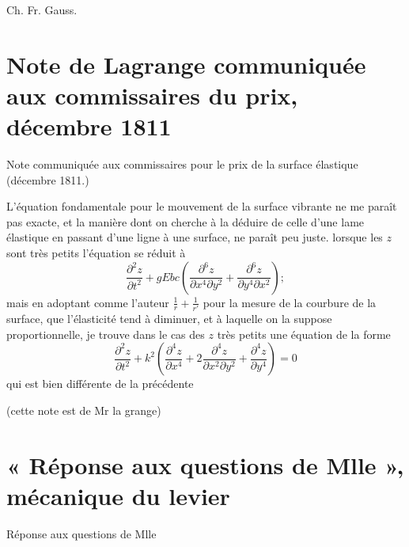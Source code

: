 \documentclass[11pt,a4paper]{article}
\begin{document}
Ch. Fr. Gauss.

\section{Note de Lagrange communiquée aux commissaires du prix, décembre 1811}

Note communiquée aux commissaires pour le prix de la surface élastique
(décembre 1811.)

L'équation fondamentale pour le mouvement de la surface vibrante ne me paraît
pas exacte, et la manière dont on cherche à la déduire de celle d'une lame
élastique en passant d'une ligne à une surface, ne paraît peu juste. lorsque
les $z$ sont très petits l'équation se réduit à
\[
\frac{\partial^2 z}{\partial t^2}
+ gEbc\left(\frac{\partial^6 z}{\partial x^4 \partial y^2}
+ \frac{\partial^6 z}{\partial y^4 \partial x^2}\right) ;
\]
mais en adoptant comme l'auteur $\frac{1}{r} + \frac{1}{r'}$ pour la mesure
de la courbure de la surface, que l'élasticité tend à diminuer, et à laquelle
on la suppose proportionnelle, je trouve dans le cas des $z$ très petits une
équation de la forme
\[
\frac{\partial^2 z}{\partial t^2}
+ k^2\left(\frac{\partial^4 z}{\partial x^4}
+ 2\frac{\partial^4 z}{\partial x^2 \partial y^2}
+ \frac{\partial^4 z}{\partial y^4}\right) = 0
\]
qui est bien différente de la précédente

(cette note est de Mr la grange)


\section{« Réponse aux questions de Mlle », mécanique du levier}

Réponse aux questions de Mlle \ill{}

\end{document}
